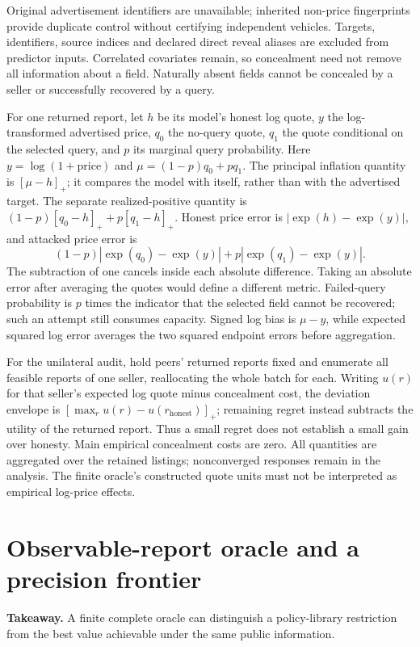 \documentclass[11pt]{article}
\begin{document}
Original advertisement identifiers are unavailable; inherited non-price
fingerprints provide duplicate control without certifying independent vehicles.
Targets, identifiers, source indices and declared direct reveal aliases are
excluded from predictor inputs. Correlated covariates remain, so concealment
need not remove all information about a field. Naturally absent fields cannot
be concealed by a seller or successfully recovered by a query.

For one returned report, let $h$ be its model's honest log quote, $y$ the
log-transformed advertised price, $q_0$ the no-query quote, $q_1$ the quote
conditional on the selected query, and $p$ its marginal query probability.
Here $y=\log(1+\mathrm{price})$ and $\mu=(1-p)q_0+pq_1$.
The principal inflation quantity is $[\mu-h]_+$; it compares the model with
itself, rather than with the advertised target. The separate realized-positive
quantity is $(1-p)[q_0-h]_++p[q_1-h]_+$.
Honest price error is $|\exp(h)-\exp(y)|$, and attacked price error is
\[
 (1-p)|\exp(q_0)-\exp(y)|+p|\exp(q_1)-\exp(y)|.
\]
The subtraction of one cancels inside each absolute difference. Taking an
absolute error after averaging the quotes would define a different metric.
Failed-query probability is $p$ times the indicator that the selected field
cannot be recovered; such an attempt still consumes capacity. Signed log bias
is $\mu-y$, while expected squared log error averages the two squared endpoint
errors before aggregation.

For the unilateral audit, hold peers' returned reports fixed and enumerate
all feasible reports of one seller, reallocating the whole batch for each.
Writing $u(r)$ for that seller's expected log quote minus concealment cost,
the deviation envelope is $[\max_r u(r)-u(r_{\mathrm{honest}})]_+$; remaining
regret instead subtracts the utility of the returned report. Thus a small
regret does not establish a small gain over honesty. Main empirical concealment
costs are zero. All quantities are aggregated over the retained listings;
nonconverged responses remain in the analysis. The finite oracle's constructed
quote units must not be interpreted as empirical log-price effects.

\section{Observable-report oracle and a precision frontier}
\noindent\textbf{Takeaway.} A finite complete oracle can distinguish a policy-library
restriction from the best value achievable under the same public information.
\end{document}
